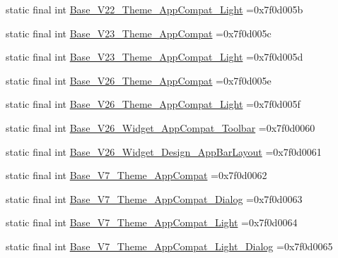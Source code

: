 \begin{DoxyCompactItemize}
\item 
static final int \mbox{\hyperlink{classcom_1_1example_1_1trainawearapplication_1_1_r_1_1style_a6468c27bc037c6bf381852d1a2d15dda}{Base\+\_\+\+V22\+\_\+\+Theme\+\_\+\+App\+Compat\+\_\+\+Light}} =0x7f0d005b
\item 
static final int \mbox{\hyperlink{classcom_1_1example_1_1trainawearapplication_1_1_r_1_1style_a97a759beaca42c76ad09a468981f1977}{Base\+\_\+\+V23\+\_\+\+Theme\+\_\+\+App\+Compat}} =0x7f0d005c
\item 
static final int \mbox{\hyperlink{classcom_1_1example_1_1trainawearapplication_1_1_r_1_1style_afe8fb37ba793eb174f937259274adb6e}{Base\+\_\+\+V23\+\_\+\+Theme\+\_\+\+App\+Compat\+\_\+\+Light}} =0x7f0d005d
\item 
static final int \mbox{\hyperlink{classcom_1_1example_1_1trainawearapplication_1_1_r_1_1style_a9667e8d7e6c140dff0ddba38c7892423}{Base\+\_\+\+V26\+\_\+\+Theme\+\_\+\+App\+Compat}} =0x7f0d005e
\item 
static final int \mbox{\hyperlink{classcom_1_1example_1_1trainawearapplication_1_1_r_1_1style_a4f78322eba6a28b0d35ddd7b8365ed9e}{Base\+\_\+\+V26\+\_\+\+Theme\+\_\+\+App\+Compat\+\_\+\+Light}} =0x7f0d005f
\item 
static final int \mbox{\hyperlink{classcom_1_1example_1_1trainawearapplication_1_1_r_1_1style_a250fd3bdba961120ba55c4fcd804bf3b}{Base\+\_\+\+V26\+\_\+\+Widget\+\_\+\+App\+Compat\+\_\+\+Toolbar}} =0x7f0d0060
\item 
static final int \mbox{\hyperlink{classcom_1_1example_1_1trainawearapplication_1_1_r_1_1style_a9822f6e8da0f4d2b47e6edd425c23ed9}{Base\+\_\+\+V26\+\_\+\+Widget\+\_\+\+Design\+\_\+\+App\+Bar\+Layout}} =0x7f0d0061
\item 
static final int \mbox{\hyperlink{classcom_1_1example_1_1trainawearapplication_1_1_r_1_1style_a9ecd16b1a1a420aa2662aa458d742578}{Base\+\_\+\+V7\+\_\+\+Theme\+\_\+\+App\+Compat}} =0x7f0d0062
\item 
static final int \mbox{\hyperlink{classcom_1_1example_1_1trainawearapplication_1_1_r_1_1style_a759b80728e2cbdc3d1eeae977065d525}{Base\+\_\+\+V7\+\_\+\+Theme\+\_\+\+App\+Compat\+\_\+\+Dialog}} =0x7f0d0063
\item 
static final int \mbox{\hyperlink{classcom_1_1example_1_1trainawearapplication_1_1_r_1_1style_a39d0b1601327a40710ca0b2a481a63d2}{Base\+\_\+\+V7\+\_\+\+Theme\+\_\+\+App\+Compat\+\_\+\+Light}} =0x7f0d0064
\item 
static final int \mbox{\hyperlink{classcom_1_1example_1_1trainawearapplication_1_1_r_1_1style_a1320ac9da6573c143036f511f997564f}{Base\+\_\+\+V7\+\_\+\+Theme\+\_\+\+App\+Compat\+\_\+\+Light\+\_\+\+Dialog}} =0x7f0d0065

\end{DoxyCompactItemize}

